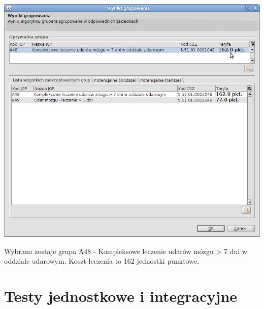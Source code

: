 \includegraphics[scale=0.4]{images/gruper15}

Wybrana zostaje grupa A48 - Kompleksowe leczenie udarów mózgu > 7 dni w oddziale udarowym. Koszt leczenia to 162 jednostki punktowe.


\section{Testy jednostkowe i integracyjne}
\label{sec:testyJednostkoweIntegracyjne}

